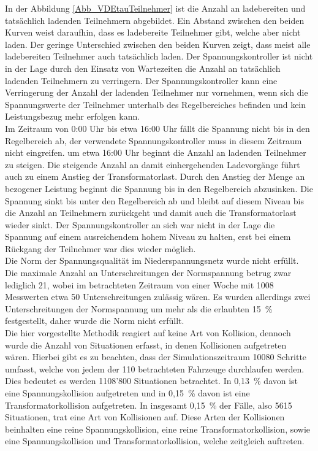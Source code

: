 In der Abbildung \ref{Abb_VDEtauTeilnehmer} ist die Anzahl an ladebereiten und tatsächlich ladenden Teilnehmern abgebildet. Ein Abstand zwischen den beiden Kurven weist daraufhin, dass es ladebereite Teilnehmer gibt, welche aber nicht laden. Der geringe Unterschied zwischen den beiden Kurven zeigt, dass meist alle ladebereiten Teilnehmer auch tatsächlich laden. Der Spannungskontroller ist nicht in der Lage durch den Einsatz von Wartezeiten die Anzahl an tatsächlich ladenden Teilnehmern zu verringern. Der Spannungskontroller kann eine Verringerung der Anzahl der ladenden Teilnehmer nur vornehmen, wenn sich die Spannungswerte der Teilnehmer unterhalb des Regelbereiches befinden und kein Leistungsbezug mehr erfolgen kann.\\
Im Zeitraum von 0:00 Uhr bis etwa 16:00 Uhr fällt die Spannung nicht bis in den Regelbereich ab, der verwendete Spannungskontroller muss in diesem Zeitraum nicht eingreifen. um etwa 16:00 Uhr beginnt die Anzahl an ladenden Teilnehmer zu steigen. Die steigende Anzahl an damit einhergehenden Ladevorgänge führt auch zu einem Anstieg der Transformatorlast. Durch den Anstieg der Menge an bezogener Leistung beginnt die Spannung bis in den Regelbereich abzusinken. Die Spannung sinkt bis unter den Regelbereich ab und bleibt auf diesem Niveau bis die Anzahl an Teilnehmern zurückgeht und damit auch die Transformatorlast wieder sinkt. Der Spannungskontroller an sich war nicht in der Lage die Spannung auf einem ausreichendem hohem Niveau zu halten, erst bei einem Rückgang der Teilnehmer war dies wieder möglich.\\
Die Norm der Spannungsqualität im Niederspannungsnetz wurde nicht erfüllt. Die maximale Anzahl an Unterschreitungen der Normspannung betrug zwar lediglich 21, wobei im betrachteten Zeitraum von einer Woche mit 1008 Messwerten etwa 50 Unterschreitungen zulässig wären. Es wurden allerdings zwei Unterschreitungen der Normspannung um mehr als die erlaubten 15~\%  festgestellt, daher wurde die Norm nicht erfüllt. \\
Die hier vorgestellte Methodik reagiert auf keine Art von Kollision, dennoch wurde die Anzahl von Situationen erfasst, in denen Kollisionen aufgetreten wären. Hierbei gibt es zu beachten, dass der Simulationszeitraum 10080 Schritte umfasst, welche von jedem der 110 betrachteten Fahrzeuge durchlaufen werden. Dies bedeutet es werden 1108'800 Situationen betrachtet. In 0,13~\% davon ist eine Spannungskollision aufgetreten und in 0,15~\% davon ist eine Transformatorkollision aufgetreten. In insgesamt 0,15~\% der Fälle, also 5615 Situationen, trat eine Art von Kollisionen auf. Diese Arten der Kollisionen beinhalten eine reine Spannungskollision, eine reine Transformatorkollision, sowie eine Spannungskollision und Transformatorkollision, welche zeitgleich auftreten. \\
